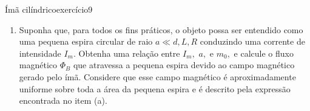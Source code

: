 \begin{exercício}{Ímã cilíndrico}{exercício9}
\begin{enumerate}[label=(\alph*)]
\begin{center}
    \end{center}
        \item Suponha que, para todos os fins práticos, o objeto possa ser entendido como uma pequena espira circular de raio \(a \ll d, L, R\) conduzindo uma corrente de intensidade \(I_m\). Obtenha uma relação entre \(I_m,\) \(a,\) e \(m_0,\) e calcule o fluxo magnético \(\Phi_B\) que atravessa a pequena espira devido ao campo magnético gerado pelo ímã. Considere que esse campo magnético é aproximadamente uniforme sobre toda a área da pequena espira e é descrito pela expressão encontrada no item (a).
    \end{enumerate}
\end{exercício}
